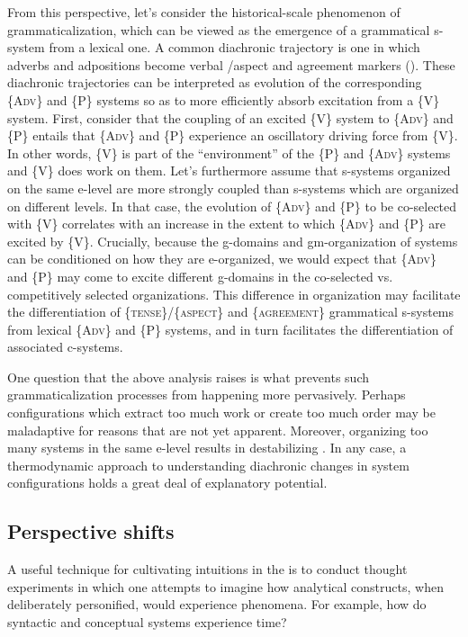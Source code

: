   From this perspective, let's consider the historical-scale phenomenon of grammaticalization, which can be viewed as the emergence of a grammatical s-system from a lexical one. A common diachronic trajectory is one in which adverbs and adpositions become verbal /aspect and agreement markers (\citealt{HeineKuteva2002,TraugottHeine1991}). These diachronic trajectories can be interpreted as evolution of the corresponding \{A\textsc{dv}\} and \{P\} systems so as to more efficiently absorb excitation from a \{V\} system. First, consider that the coupling of an excited \{V\} system to \{A\textsc{dv}\} and \{P\} entails that \{A\textsc{dv}\} and \{P\} experience an oscillatory driving force from \{V\}. In other words, \{V\} is part of the “environment” of the \{P\} and \{A\textsc{dv}\} systems and \{V\} does work on them. Let's furthermore assume that s-systems organized on the same e-level are more strongly coupled than s-systems which are organized on different levels. In that case, the evolution of \{A\textsc{dv}\} and \{P\} to be co-selected with \{V\} correlates with an increase in the extent to which \{A\textsc{dv}\} and \{P\} are excited by \{V\}. Crucially, because the g-domains and gm-organization of systems can be conditioned on how they are e-organized, we would expect that \{A\textsc{dv}\} and \{P\} may come to excite different g-domains in the co-selected vs. competitively selected organizations. This difference in organization may facilitate the differentiation of \{\textsc{tense}\}/\{\textsc{aspect}\} and \{\textsc{agreement}\} grammatical s-systems from lexical \{A\textsc{dv}\} and \{P\} systems, and in turn facilitates the differentiation of associated c-systems. 

One question that the above analysis raises is what prevents such grammaticalization processes from happening more pervasively. Perhaps configurations which extract too much work or create too much order may be maladaptive for reasons that are not yet apparent. Moreover, organizing too many systems in the same e-level results in destabilizing . In any case, a thermodynamic approach to understanding diachronic changes in system configurations holds a great deal of explanatory potential.

\subsection{Perspective shifts}

A useful technique for cultivating intuitions in the  is to conduct thought experiments in which one attempts to imagine how analytical constructs, when deliberately personified, would experience phenomena. For example, how do syntactic and conceptual systems experience time? 

